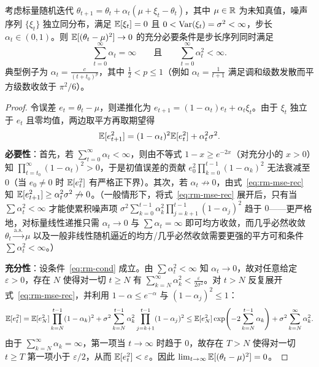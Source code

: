\begin{thmBox}
\begin{theorem}
\label{thm:robbins-monro}
考虑标量随机迭代 $\theta_{t+1} = \theta_t + \alpha_t (\mu + \xi_t - \theta_t)$，其中 $\mu \in \mathbb{R}$ 为未知真值，噪声序列 $\{\xi_t\}$ 独立同分布，满足 $\mathbb{E}[\xi_t] = 0$ 且 $0 < \operatorname{Var}(\xi_t) = \sigma^2 < \infty$，步长 $\alpha_t \in (0, 1)$。则 $\mathbb{E}[(\theta_t - \mu)^2] \to 0$ 的充分必要条件是步长序列同时满足
\begin{equation}
  \sum_{t=0}^{\infty} \alpha_t = \infty \qquad \text{且} \qquad \sum_{t=0}^{\infty} \alpha_t^2 < \infty.
  \label{eq:rm-cond}
\end{equation}
典型例子为 $\alpha_t = \frac{c}{(t + t_0)^p}$，其中 $\frac{1}{2} < p \le 1$（例如 $\alpha_t = \frac{1}{t+1}$ 满足调和级数发散而平方级数收敛于 $\pi^2/6$）。
\end{theorem}
\begin{proof}
令误差 $e_t = \theta_t - \mu$，则递推化为 $e_{t+1} = (1 - \alpha_t) e_t + \alpha_t \xi_t$。由于 $\xi_t$ 独立于 $e_t$ 且零均值，两边取平方再取期望得
\begin{equation}
  \mathbb{E}[e_{t+1}^2] = (1 - \alpha_t)^2 \mathbb{E}[e_t^2] + \alpha_t^2 \sigma^2.
  \label{eq:rm-mse-rec}
\end{equation}
\textbf{必要性}：首先，若 $\sum_{t=0}^\infty \alpha_t < \infty$，则由不等式 $1 - x \ge e^{-2x}$（对充分小的 $x > 0$）知 $\prod_{t=t_0}^\infty (1 - \alpha_t)^2 > 0$，于是初值误差的贡献 $e_0^2 \prod_{k=0}^{t-1}(1-\alpha_k)^2$ 无法衰减至 $0$（当 $e_0 \neq 0$ 时 $\mathbb{E}[e_t^2]$ 有严格正下界）。其次，若 $\alpha_t \not\to 0$，由式~\eqref{eq:rm-mse-rec} 知 $\mathbb{E}[e_{t+1}^2] \ge \alpha_t^2 \sigma^2 \not\to 0$。（一般情形下，将式~\eqref{eq:rm-mse-rec} 展开后，只有当 $\sum \alpha_t^2 < \infty$ 才能使累积噪声项 $\sigma^2 \sum_{k=0}^{t-1} \alpha_k^2 \prod_{j=k+1}^{t-1}(1-\alpha_j)^2$ 趋于 $0$——更严格地，对标量线性递推只需 $\alpha_t \to 0$ 与 $\sum \alpha_t = \infty$ 即可均方收敛，而几乎必然收敛 $\theta_t \xrightarrow{\text{a.s.}} \mu$ 以及一般非线性随机逼近的均方/几乎必然收敛需要更强的平方可和条件 $\sum \alpha_t^2 < \infty$。）

\textbf{充分性}：设条件~\eqref{eq:rm-cond} 成立。由 $\sum \alpha_t^2 < \infty$ 知 $\alpha_t \to 0$，故对任意给定 $\varepsilon > 0$，存在 $N$ 使得对一切 $t \ge N$ 有 $\sum_{k=N}^{\infty} \alpha_k^2 < \frac{\varepsilon}{2\sigma^2}$。对 $t > N$ 反复展开式~\eqref{eq:rm-mse-rec}，并利用 $1 - \alpha \le e^{-\alpha}$ 与 $(1-\alpha_j)^2 \le 1$：
\[
  \mathbb{E}[e_t^2]
  = \mathbb{E}[e_N^2] \prod_{k=N}^{t-1} (1 - \alpha_k)^2
  + \sigma^2 \sum_{k=N}^{t-1} \alpha_k^2 \prod_{j=k+1}^{t-1}(1 - \alpha_j)^2
  \le \mathbb{E}[e_N^2] \exp\!\left(-2\sum_{k=N}^{t-1}\alpha_k\right)
  + \sigma^2 \sum_{k=N}^{\infty} \alpha_k^2.
\]
由于 $\sum_{k=N}^\infty \alpha_k = \infty$，第一项当 $t \to \infty$ 时趋于 $0$，故存在 $T > N$ 使得对一切 $t \ge T$ 第一项小于 $\varepsilon/2$，从而 $\mathbb{E}[e_t^2] < \varepsilon$。因此 $\lim_{t \to \infty} \mathbb{E}[(\theta_t - \mu)^2] = 0$。
\end{proof}
\end{thmBox}

